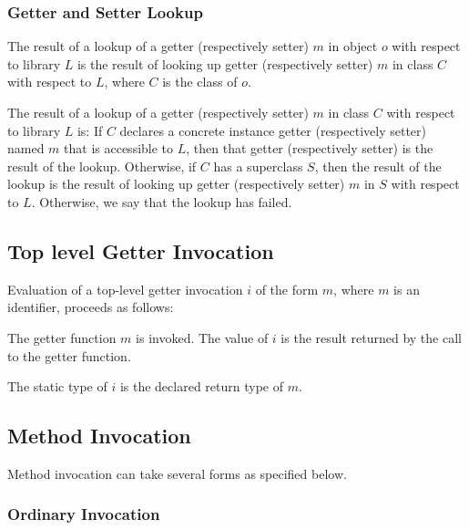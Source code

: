 \documentclass{article}
\begin{document}
\subsubsection{ Getter and Setter Lookup}

\LMHash{}
The result of a lookup of a getter (respectively setter) $m$ in object $o$  with respect  to  library $L$ is the result of looking up getter (respectively setter) $m$ in class $C$ with respect to $L$, where $C$ is the class of $o$.

\LMHash{}
The result of a lookup of a getter (respectively setter) $m$ in class $C$  with respect to library $L$ is:
If $C$ declares a concrete instance getter (respectively setter) named $m$  that is accessible to $L$,  then that getter (respectively setter) is the result of the lookup. Otherwise, if $C$ has a superclass $S$, then the result of the lookup is the result of looking up getter (respectively setter) $m$ in $S$ with respect to $L$. Otherwise, we say that the lookup has failed.



\subsection{ Top level Getter Invocation}

\LMHash{}
Evaluation of a top-level getter invocation $i$ of the form $m$, where $m$ is an identifier, proceeds as follows:

\LMHash{}
The getter function $m$ is invoked. The value of $i$ is the result returned by the call to the getter function.

\LMHash{}
The static type of $i$ is the declared return type of $m$.

\subsection{ Method Invocation}

\LMHash{}
Method invocation can take several forms as specified below. 

\subsubsection{Ordinary Invocation}
\end{document}
